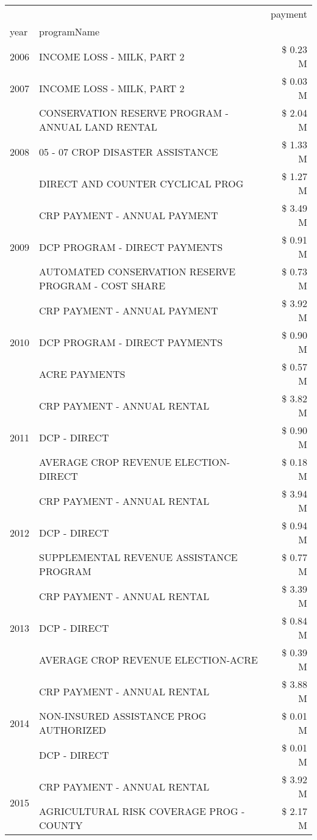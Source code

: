 \begin{tabular}{llr}
\toprule
 &  & payment \\
year & programName &  \\
\midrule
2006 & INCOME LOSS - MILK, PART 2 & \$ 0.23 M \\
\cline{1-3}
2007 & INCOME LOSS - MILK, PART 2 & \$ 0.03 M \\
\cline{1-3}
\multirow[t]{3}{*}{2008} & CONSERVATION RESERVE PROGRAM - ANNUAL LAND RENTAL & \$ 2.04 M \\
 & 05 - 07 CROP DISASTER ASSISTANCE & \$ 1.33 M \\
 & DIRECT AND COUNTER CYCLICAL PROG & \$ 1.27 M \\
\cline{1-3}
\multirow[t]{3}{*}{2009} & CRP PAYMENT - ANNUAL PAYMENT & \$ 3.49 M \\
 & DCP PROGRAM - DIRECT PAYMENTS & \$ 0.91 M \\
 & AUTOMATED CONSERVATION RESERVE PROGRAM - COST SHARE & \$ 0.73 M \\
\cline{1-3}
\multirow[t]{3}{*}{2010} & CRP PAYMENT - ANNUAL PAYMENT & \$ 3.92 M \\
 & DCP PROGRAM - DIRECT PAYMENTS & \$ 0.90 M \\
 & ACRE PAYMENTS & \$ 0.57 M \\
\cline{1-3}
\multirow[t]{3}{*}{2011} & CRP PAYMENT - ANNUAL RENTAL & \$ 3.82 M \\
 & DCP - DIRECT & \$ 0.90 M \\
 & AVERAGE CROP REVENUE ELECTION-DIRECT & \$ 0.18 M \\
\cline{1-3}
\multirow[t]{3}{*}{2012} & CRP PAYMENT - ANNUAL RENTAL & \$ 3.94 M \\
 & DCP - DIRECT & \$ 0.94 M \\
 & SUPPLEMENTAL REVENUE ASSISTANCE PROGRAM & \$ 0.77 M \\
\cline{1-3}
\multirow[t]{3}{*}{2013} & CRP PAYMENT - ANNUAL RENTAL & \$ 3.39 M \\
 & DCP - DIRECT & \$ 0.84 M \\
 & AVERAGE CROP REVENUE ELECTION-ACRE & \$ 0.39 M \\
\cline{1-3}
\multirow[t]{3}{*}{2014} & CRP PAYMENT - ANNUAL RENTAL & \$ 3.88 M \\
 & NON-INSURED ASSISTANCE PROG AUTHORIZED & \$ 0.01 M \\
 & DCP - DIRECT & \$ 0.01 M \\
\cline{1-3}
\multirow[t]{3}{*}{2015} & CRP PAYMENT - ANNUAL RENTAL & \$ 3.92 M \\
 & AGRICULTURAL RISK COVERAGE PROG - COUNTY & \$ 2.17 M \\

\end{tabular}
